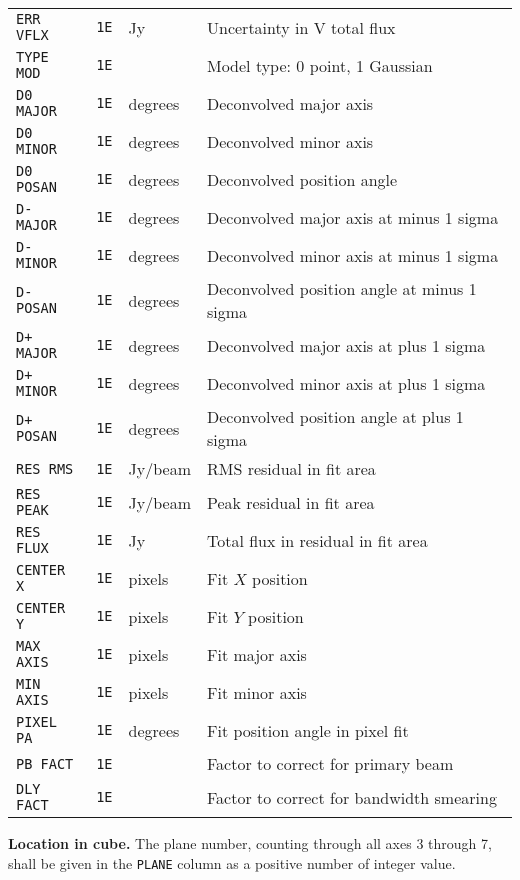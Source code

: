 \documentclass[twoside]{article}
\begin{document}
\begin{center}
\begin{tabular}{lcll}
{\tt ERR VFLX} & {\tt 1E} & Jy      & Uncertainty in V total flux \\
{\tt TYPE MOD} & {\tt 1E} &         & Model type: 0 point, 1 Gaussian \\
{\tt D0 MAJOR} & {\tt 1E} & degrees & Deconvolved major axis \\
{\tt D0 MINOR} & {\tt 1E} & degrees & Deconvolved minor axis \\
{\tt D0 POSAN} & {\tt 1E} & degrees & Deconvolved position angle \\
{\tt D- MAJOR} & {\tt 1E} & degrees & Deconvolved major axis at minus 1 sigma \\
{\tt D- MINOR} & {\tt 1E} & degrees & Deconvolved minor axis at minus 1 sigma \\
{\tt D- POSAN} & {\tt 1E} & degrees & Deconvolved position angle at minus 1 sigma \\
{\tt D+ MAJOR} & {\tt 1E} & degrees & Deconvolved major axis at plus 1 sigma \\
{\tt D+ MINOR} & {\tt 1E} & degrees & Deconvolved minor axis at plus 1 sigma \\
{\tt D+ POSAN} & {\tt 1E} & degrees & Deconvolved position angle at plus 1 sigma \\
{\tt RES RMS}  & {\tt 1E} & Jy/beam & RMS residual in fit area \\
{\tt RES PEAK} & {\tt 1E} & Jy/beam & Peak residual in fit area \\
{\tt RES FLUX} & {\tt 1E} & Jy      & Total flux in residual in fit area \\
{\tt CENTER X} & {\tt 1E} & pixels  & Fit $X$ position \\
{\tt CENTER Y} & {\tt 1E} & pixels  & Fit $Y$ position \\
{\tt MAX AXIS} & {\tt 1E} & pixels  & Fit major axis \\
{\tt MIN AXIS} & {\tt 1E} & pixels  & Fit minor axis \\
{\tt PIXEL PA} & {\tt 1E} & degrees & Fit position angle in pixel fit \\
{\tt PB FACT}  & {\tt 1E} &         & Factor to correct for primary beam \\
{\tt DLY FACT} & {\tt 1E} &         & Factor to correct for bandwidth smearing
\end{tabular}
\end{center}

{\bf Location in cube.} The plane number, counting through all axes 3
through 7, shall be given in the {\tt PLANE} column as a positive
number of integer value.
\end{document}
